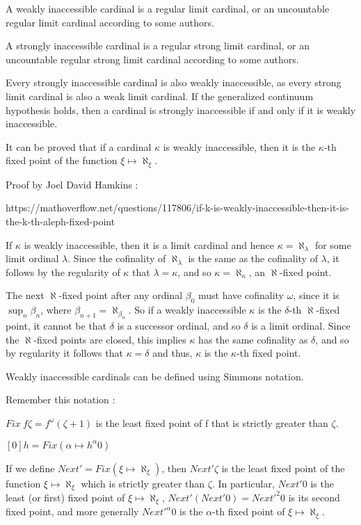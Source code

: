 \documentclass[10pt]{article}
\begin{document}
A weakly inaccessible cardinal is a regular limit cardinal, or an uncountable regular limit cardinal according to some authors.

A strongly inaccessible cardinal is a regular strong limit cardinal, or an uncountable regular strong limit cardinal according to some authors.

Every strongly inaccessible cardinal is also weakly inaccessible, as every strong limit cardinal is also a weak limit cardinal. If the generalized continuum hypothesis holds, then a cardinal is strongly inaccessible if and only if it is weakly inaccessible.

\bigskip

It can be proved that if a cardinal \( \kappa \) is weakly inaccessible, then it is the \(\kappa\)-th fixed point of the function \( \xi \mapsto \aleph_\xi \). 

Proof by Joel David Hamkins :

https://mathoverflow.net/questions/117806/if-k-is-weakly-inaccessible-then-it-is-the-k-th-aleph-fixed-point 

If $\kappa$ is weakly inaccessible, then it is a limit cardinal and hence $\kappa=\aleph_\lambda$
for some limit ordinal $\lambda$. Since the cofinality of $\aleph_\lambda$ is
the same as the cofinality of $\lambda$, it follows by the regularity of $\kappa$ that
$\lambda=\kappa$, and so $\kappa=\aleph_\kappa$, an $\aleph$-fixed point. 

The next
$\aleph$-fixed point after any ordinal $\beta_0$ must have
cofinality $\omega$, since it is $\sup_n\beta_n$, where
$\beta_{n+1}=\aleph_{\beta_n}$. So if a weakly inaccessible
$\kappa$ is the $\delta$-th $\aleph$-fixed point, it cannot be
that $\delta$ is a successor ordinal, and so $\delta$ is a limit ordinal. Since the
$\aleph$-fixed points are closed, this implies $\kappa$ has the same cofinality as $\delta$, and so by regularity it follows that $\kappa=\delta$ and thus, $\kappa$ is the $\kappa$-th fixed point.

\bigskip
 
Weakly inaccessible cardinals can be defined using Simmons notation.

Remember this notation :

\( Fix\ f \zeta = f^\omega (\zeta+1) \) is the least fixed point of f that is strictly greater than \( \zeta \).

\( [0] h = Fix (\alpha \mapsto h^\alpha 0) \)

If we define \( Next' = Fix (\xi \mapsto \aleph_\xi) \), then \( Next' \zeta \) is the least fixed point of the function \( \xi \mapsto \aleph_\xi \) which is strictly greater than \( \zeta \). In particular, \( Next' 0 \) is the least (or first) fixed point of \( \xi \mapsto \aleph_\xi \), \( Next' (Next' 0) = Next'^2 0 \) is its second fixed point, and more generally \( Next'^\alpha 0 \) is the \(\alpha\)-th fixed point of \( \xi \mapsto \aleph_\xi \).
\end{document}
